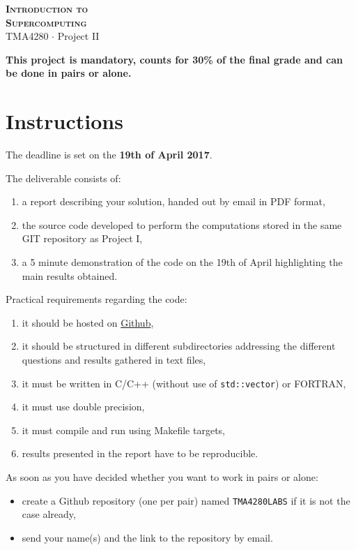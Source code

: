 \documentclass[onecolumn, oneside, a4paper, 11pt]{memoir}
\theoremstyle{remark}
\begin{document}
\pagestyle{empty}

\begin{center}
  {\Huge \bfseries \scshape
    Introduction to \\[0.2\baselineskip] Supercomputing} \\[2\baselineskip]
  {\Large TMA4280 $\cdot$ Project II} \\[2\baselineskip]
\end{center}

\textbf{This project is mandatory, counts for 30\% of the final grade and can be done in pairs or alone.}

\section*{Instructions}

The deadline is set on the \textbf{19th of April 2017}.


\medskip
The deliverable consists of:
\begin{enumerate}
\item a report describing your solution, handed out by email in PDF format,
\item the source code developed to perform the computations stored in the same GIT repository as Project I,
\item a 5 minute demonstration of the code on the 19th of April highlighting the main results obtained.
\end{enumerate}

\medskip
Practical requirements regarding the code:
\begin{enumerate}
\item it should be hosted on \href{https://github.com/}{Github},
\item it should be structured in different subdirectories addressing the different questions and results gathered in text files,
\item it must be written in C/C++ (without use of \texttt{std::vector}) or FORTRAN,
\item it must use double precision,
\item it must compile and run using Makefile targets,
\item results presented in the report have to be reproducible.
\end{enumerate}

As soon as you have decided whether you want to work in pairs or alone:
\begin{itemize}
\item create a Github repository (one per pair) named \texttt{TMA4280LABS} if it is not the case already,
\item send your name(s) and the link to the repository by email.
\end{itemize}
\end{document}
